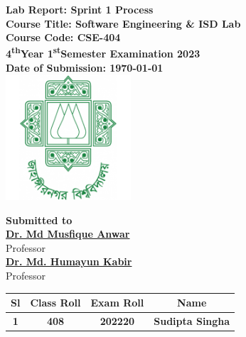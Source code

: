 \documentclass[a4paper,12pt]{article}
\begin{document}
\begin{center}
    \vspace{0.2cm}
    \textbf{\large{Lab Report: Sprint 1 Process}}\\
    \vspace{0.2cm}
    \textbf{Course Title: Software Engineering \& ISD Lab}\\
    \vspace{0.2cm}
    \textbf{Course Code: CSE-404}\\
    \vspace{0.2cm}
    \textbf{4\textsuperscript{th}Year 1\textsuperscript{st}Semester Examination 2023}\\
    \vspace{0.5cm}
    \textbf{Date of Submission: \today}\\

    \vspace{1.5cm}
    \includegraphics[width=0.35\textwidth]{images/logo.png}\\ %
    \vspace{1cm}

    \textbf{Submitted to}\\
    \vspace{0.2cm}
    \textbf{\href{https://juniv.edu/teachers/musfique.anwar}{Dr. Md Musfique Anwar}}\\
    {Professor}\\
    \vspace{0.2cm}
    \textbf{\href{https://juniv.edu/teachers/hkabir}{Dr. Md. Humayun Kabir}}\\
    {Professor}\\


    \vspace{1cm}

    \begin{table}[h!]
        \centering
        \begin{tabular}{|c|c|c|c|}
            \hline
            \rowcolor[HTML]{2F4F4F} %
            {\color[HTML]{FFFFFF}\textbf{Sl}}& {\color[HTML]{FFFFFF}\textbf{Class Roll}}& {\color[HTML]{FFFFFF}\textbf{Exam Roll}}& {\color[HTML]{FFFFFF}\textbf{Name}}\\ \hline
            \rowcolor[HTML]{B0E0E6}
            \textbf{1}& \textbf{408} & \textbf{202220} & \textbf{Sudipta Singha} \\ \hline
       

\end{tabular}
\end{table}
\end{center}
\end{document}
